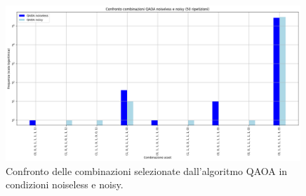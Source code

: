\begin{figure}[ht!]
    \centering
    \includegraphics[width=0.99\textwidth]{images/risultati/confronto-qaoa.png}
    \caption{Confronto delle combinazioni selezionate dall'algoritmo QAOA in condizioni noiseless e noisy.}
    \label{fig:confronto-qaoa-noiseless-noisy}
\end{figure}


